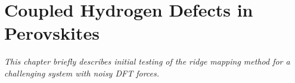 \chapter{Coupled Hydrogen Defects in Perovskites}
\label{chap:perovskites}

\textit{This chapter briefly describes initial testing of the ridge mapping method for a challenging system with noisy DFT forces.}




